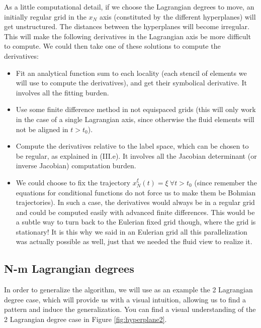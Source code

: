 \documentclass[11pt, a4paper]{article} %
\begin{document}
As a little computational detail, if we choose the Lagrangian degrees to move, an initially regular grid in the $x_N$ axis (constituted by the different hyperplanes) will get unstructured. The distances between the hyperplanes will become irregular. This will make the following derivatives in the Lagrangian axis be more difficult to compute. We could then take one of these solutions to compute the derivatives:
\begin{itemize}
\item Fit an analytical function sum to each locality (each stencil of elements we will use to compute the derivatives), and get their symbolical derivative. It involves all the fitting burden.
\item Use some finite difference method in not equispaced grids (this will only work in the case of a single Lagrangian axis, since otherwise the fluid elements will not be aligned in $t>t_0$).
\item Compute the derivatives relative to the label space, which can be chosen to be regular, as explained in (III.e). It involves all the Jacobian determinant (or inverse Jacobian) computation burden.
\item We could choose to fix the trajectory $x_N^\xi(t)=\xi\ \forall t>t_0$ (since remember the equations for conditional functions do not force us to make them be Bohmian trajectories). In such a case, the derivatives would always be in a regular grid and could be computed easily with advanced finite differences. This would be a subtle way to turn back to the Eulerian fixed grid though, where the grid is stationary! It is this why we said in an Eulerian grid all this parallelization was actually possible as well, just that we needed the fluid view to realize it.
\end{itemize} 



\subsection*{N-m Lagrangian degrees}
In order to generalize the algorithm, we will use as an example the 2 Lagrangian degree case, which will provide us with a visual intuition, allowing us to find a pattern and induce the generalization. You can find a visual understanding of the 2 Lagrangian degree case in Figure \ref{fig:hyperplane2}.
\end{document}
